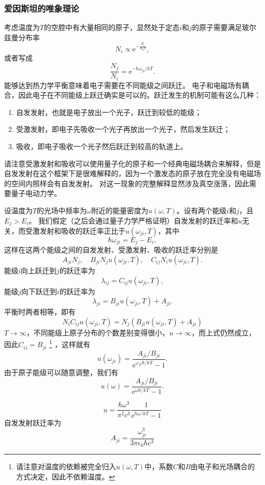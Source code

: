 \documentclass[UTF8, a4paper]{ctexart}
\newcommand*{\ee}{\mathrm{e}}
\begin{document}
\subsubsection{爱因斯坦的唯象理论}

考虑温度为$T$的空腔中有大量相同的原子，显然处于定态$i$和$j$的原子需要满足玻尔兹曼分布率
\[
    N_i \propto \ee^{-\frac{E_i}{k_\text{B} T}},
\]
或者写成
\[
    \frac{N_j}{N_i} = \ee^{-\hbar \omega_{ji} / kT}.
\]
能够达到热力学平衡意味着电子需要在不同能级之间跃迁。
电子和电磁场有耦合，因此电子在不同能级上跃迁确实是可以的。跃迁发生的机制可能有这么几种：
\begin{enumerate}
    \item 自发发射，也就是电子放出一个光子，跃迁到较低的能级；
    \item 受激发射，即电子先吸收一个光子再放出一个光子，然后发生跃迁；
    \item 吸收，即电子吸收一个光子然后跃迁到较高的轨道上。
\end{enumerate}
请注意受激发射和吸收可以使用量子化的原子和一个经典电磁场耦合来解释，但是自发发射在这个框架下是很难解释的，因为一个激发态的原子放在完全没有电磁场的空间内照样会有自发发射。
对这一现象的完整解释显然涉及真空涨落，因此需要量子电动力学。

设温度为$T$的光场中频率为$\omega$附近的能量密度为$u(\omega, T)$。设有两个能级$i$和$j$，且$E_j > E_i$。
我们假定（之后会通过量子力学严格证明）自发发射的跃迁率和$u$无关，而受激发射和吸收的跃迁率正比于$u(\omega_{ji}, T)$，其中
\begin{equation}
    \hbar \omega_{ji} = E_j - E_i,
    \label{eq:photon-energy}
\end{equation}
这样在这两个能级之间的自发发射、受激发射、吸收的跃迁率分别是
\[
    A_{ji} N_j, \quad B_{ji} N_j u(\omega_{ji}, T), \quad C_{ij} N_i u(\omega_{ji}, T).
\]
能级$i$向上跃迁到$j$的跃迁率为
\[
    \lambda_{ij} = C_{ij} u(\omega_{ji}, T),
\]
能级$j$向下跃迁到$i$的跃迁率为
\[
    \lambda_{ji} = B_{ji} u(\omega_{ji}, T) + A_{ji}.
\]
平衡时两者相等，即有
\[
    N_i C_{ij} u(\omega_{ji}, T) = N_j (B_{ji} u(\omega_{ji}, T) + A_{ji})
\]
$T \to \infty$，不同能级上原子分布的个数差别变得很小，$u \to \infty$，而上式仍然成立，因此$C_{ij} = B_{ji}$%
\footnote{请注意对温度的依赖被完全归入$u(\omega, T)$中，系数$C$和$B$由电子和光场耦合的方式决定，因此不依赖温度。}%
，这样就有
\[
    u(\omega_{ji}) = \frac{A_{ji} / B_{ji}}{\ee^{\omega_{ji} \hbar / k T} - 1}.
\]
由于原子能级可以随意调整，我们有
\[
    u(\omega) = \frac{A_{ji} / B_{ji}}{\ee^{\omega \hbar / k T} - 1}.
\]

\[
    u = \frac{\hbar \omega^3}{\pi^2 c^3} \frac{1}{\ee^{\hbar \omega / kT} - 1}
\]
自发发射跃迁率为
\[
    A_{ji} = \frac{\omega_{ji}^3}{3\pi \epsilon_0 \hbar c^3}
\]
\end{document}
